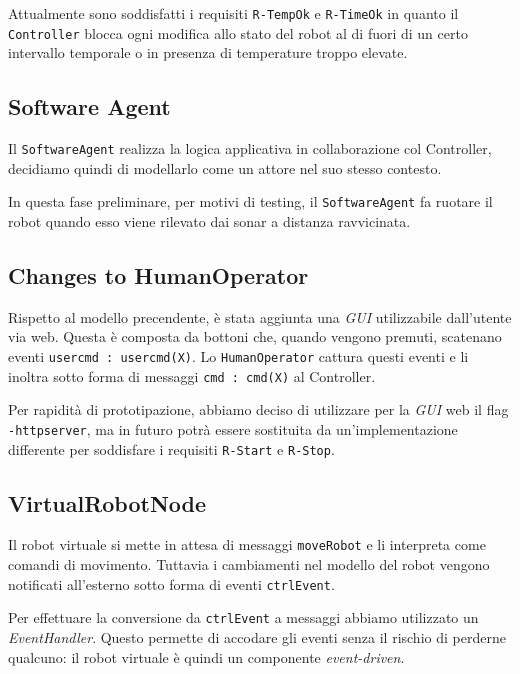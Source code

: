 \documentclass{../llncs}
\newcommand{\codescript}[1]{{\mbox{\small{\texttt{#1}}}}\xspace}
\newcommand{\code}[1]{{\color{blue}\small{\texttt{#1}}}}
\begin{document}
Attualmente sono soddisfatti i requisiti \code{R-TempOk} e \code{R-TimeOk} in quanto il \texttt{Controller} blocca ogni modifica allo stato del robot al di fuori di un certo intervallo temporale o in presenza di temperature troppo elevate.

\subsection{Software Agent}
Il \texttt{SoftwareAgent} realizza la logica applicativa in collaborazione col Controller,  decidiamo quindi di modellarlo come un attore nel suo stesso contesto.

In questa fase preliminare, per motivi di testing, il \texttt{SoftwareAgent} fa ruotare il robot quando esso viene rilevato dai sonar a distanza ravvicinata.

 

\subsection{Changes to HumanOperator}
Rispetto al modello precendente, è stata aggiunta una \emph{GUI} utilizzabile dall'utente via web. Questa è composta da bottoni che, quando vengono premuti, scatenano eventi \codescript{usercmd : usercmd(X)}. Lo \texttt{HumanOperator} cattura questi eventi e li inoltra sotto forma di messaggi \codescript{cmd : cmd(X)} al Controller.

Per rapidità di prototipazione, abbiamo deciso di  utilizzare per la \emph{GUI} web il flag \codescript{-httpserver}, ma in futuro potrà essere sostituita da un'implementazione differente per soddisfare i requisiti \code{R-Start} e \code{R-Stop}.

 

\subsection{VirtualRobotNode}
Il robot virtuale si mette in attesa di messaggi \codescript{moveRobot} e li interpreta come comandi di movimento. Tuttavia i cambiamenti nel modello del robot vengono notificati all'esterno sotto forma di eventi \codescript{ctrlEvent}.

Per effettuare la conversione da \codescript{ctrlEvent} a messaggi abbiamo utilizzato un \emph{EventHandler}. Questo permette di accodare gli eventi senza il rischio di perderne qualcuno: il robot virtuale è quindi un componente \emph{event-driven}.
\end{document}
